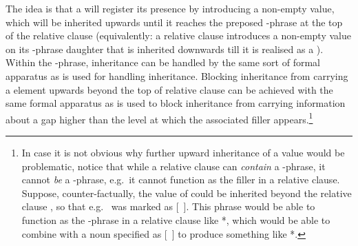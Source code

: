 \documentclass[output=paper,nonflat,draftmode]{./langsci/langscibook}
\begin{document}
The idea is that a  will register its presence by introducing a non-empty
 value, which will be inherited upwards until it reaches the preposed
-phrase at the top of the relative clause (equivalently: a relative clause
introduces a non-empty  value on its -phrase daughter that is inherited downwards till it is
realised as a ). Within the -phrase,  inheritance can
be handled by the same sort of formal apparatus as is used for handling 
inheritance. Blocking  inheritance from carrying a  element
upwards beyond the top of relative clause can be achieved with the same formal apparatus
as is used to block  inheritance from carrying information about a gap
higher than the level at which the associated filler appears.\footnote{In case it is not
  obvious why further upward inheritance of a  value would be problematic,
  notice that while a relative clause can \emph{contain} a -phrase, it cannot
  \emph{be} a -phrase, e.g.\ it cannot function as the filler in a relative
  clause. Suppose, counter-factually, the  value of  could be inherited
  beyond the relative clause , so that e.g.\  was marked as [~]. This phrase would be able to
  function as the -phrase in a relative clause like *, which would be able to combine with a noun specified as
  [~] to produce something like *.}
\end{document}
